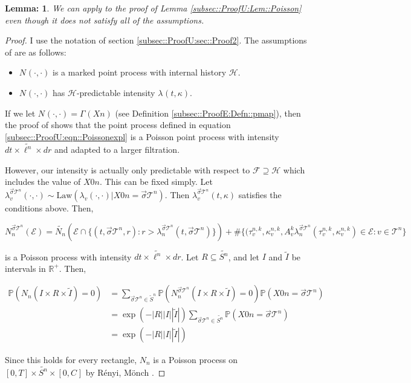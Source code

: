 \documentclass[12pt]{article}
\newcommand{\mb}{\mathbb}
\newcommand{\mc}{\mathcal}
\newcommand{\te}{\text}
\newcommand{\ind}{\hspace{24pt}}
\newcommand{\pr}{\mb{P}}							%
\renewcommand{\v}{v}							%
\renewcommand{\S}{S}							%
\newcommand{\s}{\sigma}							%
\newcommand{\sv}{\vec{\s}}						%
\renewcommand{\t}{t}							%
\newcommand{\X}{X}								%
\newcommand{\poiss}[1]{N_{#1}}						%
\newcommand{\law}{\te{Law}}							%
\newcommand{\pup}[1]{^{#1}}							%
\newcommand{\tree}{\mc{T}}							%
\renewcommand{\r}{r}								%
\newcommand{\rt}[1]{\tau^{#1}}						%
\renewcommand{\it}{k}								%
\newcommand{\numb}{n}								%
\newcommand{\XState}[1]{\S^{#1}}				%
\newcommand{\rate}[1]{\lambda_{#1}}					%
\newcommand{\const}[1]{C_{#1}}						%
\newcommand{\Sm}{\ell}								%
\newcommand{\alt}{\widetilde}						%
\newcommand{\rv}{A}								%
\newcommand{\evnt}{\mc{E}}						%
\renewcommand{\mark}[1]{\kappa^{#1}}				%
\newcommand{\pmap}[1]{\Gamma_{#1}}				%
\newcommand{\inte}{I}							%
\newtheorem{lem}[thms]{Lemma: }
\begin{document}
\begin{lem}
We can apply \cite[Proposition 14.7.I(b)]{DalVer08} to the proof of Lemma \ref{subsec::ProofU:Lem::Poisson} even though it does not satisfy all of the assumptions.
\label{sec::TL:Lem::embedding}
\end{lem}
\begin{proof}
I use the notation of section \ref{subsec::ProofU:sec::Proof2}. The assumptions of \cite[Proposition 14.7.I(b)]{DalVer08} are as follows:

\begin{itemize}
\item \(\poiss{}(\cdot,\cdot)\) is a marked point process with internal history \(\mc{H}\).

\item \(\poiss{}(\cdot,\cdot)\) has \(\mc{H}\)-predictable intensity \(\rate{}(\t,\kappa)\).
\end{itemize}

If we let \(\poiss{}(\cdot,\cdot) = \pmap{}(\X{}{}{\numb})\) (see Definition \ref{subsec::ProofE:Defn::pmap}), then the proof of \cite[Proposition 14.7.I(b)]{DalVer08} shows that the point process defined in equation \eqref{subsec::ProofU:eqn::Poissonexpl} is a Poisson point process with intensity \(d\t\times \alt{\Sm^\numb}\times d\r\) and adapted to a larger filtration.

\ind However, our intensity is actually only predictable with respect to \(\mc{F} \supseteq \mc{H}\) which includes the value of \(\X{}{0}{\numb}\). This can be fixed simply. Let \(\rate{\v}^{\sv{}{\tree\pup{\numb}}}(\cdot,\cdot) \sim \law(\rate{\v}(\cdot,\cdot)|\X{}{0}{\numb} = \sv{}{\tree\pup{\numb}})\). Then \(\rate{\v}^{\sv{}{\tree\pup{\numb}}}(t,\kappa)\) satisfies the conditions above. Then,

\[\poiss{\numb}^{\sv{}{\tree\pup{\numb}}}(\evnt) = \alt{\poiss{\numb}}\left(\evnt\cap\{(t,\sv{}{\tree\pup{\numb}},\r):\r > \rate{\numb}^{\sv{}{\tree\pup{\numb}}}(\t,\sv{}{\tree\pup{\numb}})\}\right) + \#\{(\rt{\numb,\it}_\v,\mark{\numb,\it}_\v,\rv_{\v}^{\it}\rate{\numb}^{\sv{}{\tree\pup{\numb}}}(\rt{\numb,\it}_\v,\mark{\numb,\it}_\v) \in \evnt: \v\in \tree\pup{\numb}\}\]

is a Poisson process with intensity \(d\t\times \alt{\Sm^\numb}\times d\r\). Let \(R \subseteq \alt{\S^\numb}\), and let \(\inte\) and \(\alt{\inte}\) be intervals in \(\mb{R}^+\). Then,

\begin{align*}
\pr\left(\poiss{\numb}\left(\inte\times R\times \alt{\inte}\right) = 0\right) &= \sum_{\sv{}{\tree\pup{\numb}} \in \alt{S}^\numb} \pr\left(\poiss{\numb}^{\sv{}{\tree\pup{\numb}}}\left(\inte\times R\times \alt{\inte}\right) = 0\right)\pr(\X{}{0}{\numb} = \sv{}{\tree\pup{\numb}})\\
&= \exp\left(-|R| |\inte||\alt{\inte}|\right)\sum_{\sv{}{\tree\pup{\numb}} \in \alt{S^\numb}} \pr(\X{}{0}{\numb} = \sv{}{\tree\pup{\numb}})\\
&=\exp\left(-|R| |\inte||\alt{\inte}|\right)
\end{align*}

Since this holds for every rectangle, \(\poiss{\numb}\) is a Poisson process on \([0,T]\times \alt{\S^\numb}\times [0,\const{}]\) by R\'enyi, M\"onch \cite[Theorem 9.2.XII]{DalVer08}.



\end{proof}
\newpage


\end{document}
